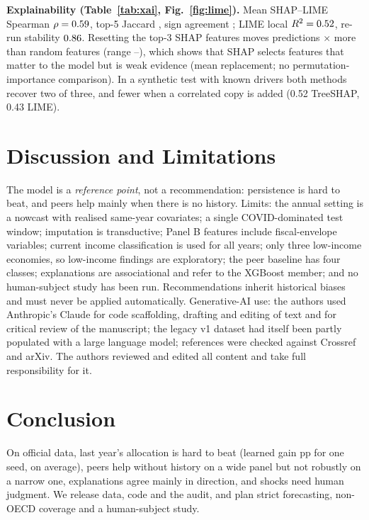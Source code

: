 \documentclass[conference]{IEEEtran}
\DeclareRobustCommand*{\_}{\textunderscore\hskip0pt\relax}
\begin{document}
\textbf{Explainability (Table~\ref{tab:xai}, Fig.~\ref{fig:lime}).} Mean SHAP--LIME Spearman $\rho=0.59$, top-5 Jaccard \AgrJacMean, sign agreement \AgrSignMean; LIME local $R^2=0.52$, re-run stability $0.86$. Resetting the top-3 SHAP features moves predictions \AgrFaithMean$\times$ more than random features (range \AgrFaithMin--\AgrFaithMax), which shows that SHAP selects features that matter to the model but is weak evidence (mean replacement; no permutation-importance comparison). In a synthetic test with known drivers both methods recover two of three, and fewer when a correlated copy is added (0.52 TreeSHAP, 0.43 LIME).

\section{Discussion and Limitations}
The model is a \emph{reference point}, not a recommendation: persistence is hard to beat, and peers help mainly when there is no history. Limits: the annual setting is a nowcast with realised same-year covariates; a single COVID-dominated test window; imputation is transductive; Panel B features include fiscal-envelope variables; current income classification is used for all years; only three low-income economies, so low-income findings are exploratory; the peer baseline has four classes; explanations are associational and refer to the XGBoost member; and no human-subject study has been run. Recommendations inherit historical biases and must never be applied automatically. Generative-AI use: the authors used Anthropic's Claude for code scaffolding, drafting and editing of text and for critical review of the manuscript; the legacy v1 dataset had itself been partly populated with a large language model; references were checked against Crossref and arXiv. The authors reviewed and edited all content and take full responsibility for it.

\section{Conclusion}
On official data, last year's allocation is hard to beat (learned gain \ResPairedGain{} pp for one seed, \AnnSeedMeanGain{} on average), peers help without history on a wide panel but not robustly on a narrow one, explanations agree mainly in direction, and shocks need human judgment. We release data\cite{chaudhari2026dataset}, code\cite{chaudhari2026code} and the audit, and plan strict forecasting, non-OECD coverage and a human-subject study.



\end{document}
